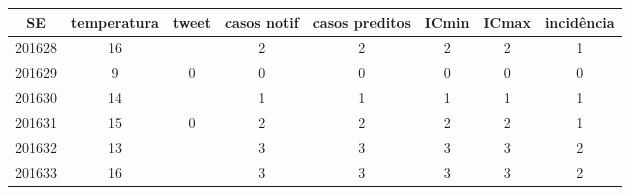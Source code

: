 \begin{tabular}{c|ccccccc}
  \hline
SE & temperatura & tweet & casos notif & casos preditos & ICmin & ICmax & incidência \\ 
  \hline
201628 & 16 &  & 2 & 2 & 2 & 2 & 1 \\ 
  201629 & 9 & 0 & 0 & 0 & 0 & 0 & 0 \\ 
  201630 & 14 &  & 1 & 1 & 1 & 1 & 1 \\ 
  201631 & 15 & 0 & 2 & 2 & 2 & 2 & 1 \\ 
  201632 & 13 &  & 3 & 3 & 3 & 3 & 2 \\ 
  201633 & 16 &  & 3 & 3 & 3 & 3 & 2 \\ 
   \hline
\end{tabular}
